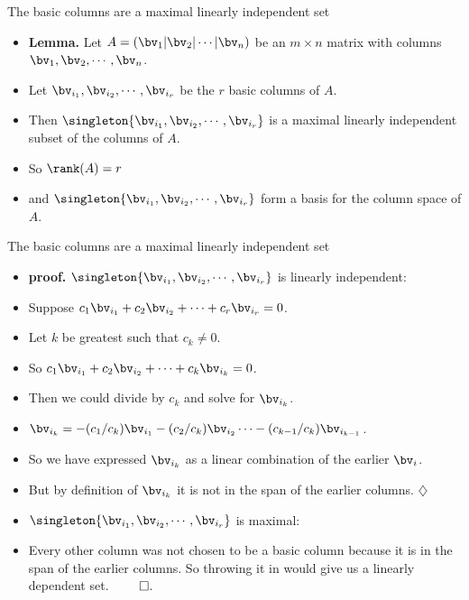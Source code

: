\documentclass{beamer}
\begin{document}
\begin{frame}{The basic columns are a maximal linearly independent set}

\begin{itemize}
\item \textbf{Lemma.} Let $A = \left(\bv_1 \vert \bv_2 \vert \cdots \vert \bv_n\right)$
be an $m\times n$ matrix with columns $\bv_1,\bv_2,\cdots,\bv_n$.
\item Let $\bv_{i_1},\bv_{i_2},\cdots,\bv_{i_r}$ be the $r$ basic columns of $A$.
\item Then $\singleton{\bv_{i_1},\bv_{i_2},\cdots,\bv_{i_r}}$ is a maximal linearly independent
subset of the columns of $A$.
\item So $\rank(A) = r$
\item and $\singleton{\bv_{i_1},\bv_{i_2},\cdots,\bv_{i_r}}$ form a basis for the
column space of $A$.
\end{itemize}

\end{frame}


\begin{frame}{The basic columns are a maximal linearly independent set}

\begin{itemize}
\item \textbf{proof.} $\singleton{\bv_{i_1},\bv_{i_2},\cdots,\bv_{i_r}}$ is linearly
independent:
\item Suppose $c_1\bv_{i_1} + c_2\bv_{i_2} + \cdots + c_r \bv_{i_r} = 0$.
\item Let $k$ be greatest such that $c_k\not=0$.
\item So $c_1\bv_{i_1} + c_2\bv_{i_2} + \cdots + c_k \bv_{i_k} = 0$.
\item Then we could divide by $c_k$ and solve for $\bv_{i_k}$.
\item $\bv_{i_k} = -(c_1/c_k)\bv_{i_1} -(c_2/c_k)\bv_{i_2} \cdots -(c_{k-1}/c_k)\bv_{i_{k-1}}$.
\item So we have expressed $\bv_{i_k}$ as a linear combination of the earlier $\bv_i$.
\item But by definition of $\bv_{i_k}$ it is not in the span of the earlier columns. $\diamondsuit$
\item $\singleton{\bv_{i_1},\bv_{i_2},\cdots,\bv_{i_r}}$ is maximal:
\item Every other
column was not chosen to be a basic column because it is in the span of the
earlier columns. So throwing it in would give us a linearly dependent set. $\qed$.
\end{itemize}

\end{frame}
\end{document}
